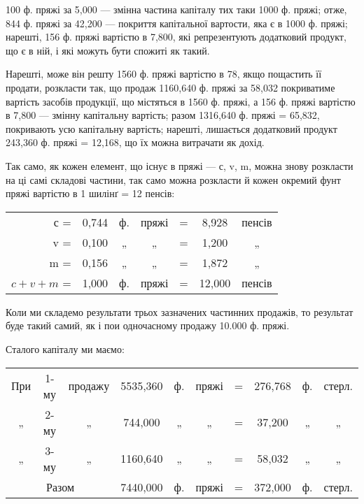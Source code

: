 \parcont{}  %
100 ф. пряжі за 5,000 — змінна частина капіталу тих таки
1000 ф. пряжі; отже, 844 ф. пряжі за 42,200 — покриття
капітальної вартости, яка є в 1000 ф. пряжі; нарешті, 156 ф. пряжі
вартістю в 7,800, які репрезентують додатковий продукт, що
є в ній, і які можуть бути спожиті як такий.

Нарешті, може він решту 1560 ф. пряжі вартістю в 78,
якщо пощастить її продати, розкласти так, що продаж 1160,640 ф.
пряжі за 58,032 покриватиме вартість засобів продукції, що
містяться в 1560 ф. пряжі, а 156 ф. пряжі вартістю в 7,800 —
змінну капітальну вартість; разом 1316,640 ф. пряжі = 65,832,
покривають усю капітальну вартість; нарешті, лишається додатковий
продукт 243,360 ф. пряжі = 12,168, що їх можна витрачати як
дохід.

Так само, як кожен елемент, що існує в пряжі — с, v, m, можна
знову розкласти на ці самі складові частини, так само можна розкласти й
кожен окремий фунт пряжі вартістю в 1 шилінґ = 12 пенсів:
\begin{table}[h]
\centering
\setlength{\tabcolsep}{2pt}
\begin{tabularx}{\textwidth}{r c c c c c c}

с = & 0,744 & ф. & пряжі & = & 8,928 & пенсів \\
v = & 0,100 & „ & „ & = & 1,200 & „ \\
m = & 0,156 & „ & „ & = & 1,872 & „ \\
\cmidrule{1-7}
$c + v + m$  = & 1,000 & ф. & пряжі & = & 12,000 & пенсів \\
\end{tabularx}
\end{table}
Коли ми складемо результати трьох зазначених частинних продажів, то
результат буде такий самий, як і пои одночасному продажу 10.000 ф.
пряжі.

Сталого капіталу ми маємо:

\begin{table}[h]
  \setlength{\tabcolsep}{2pt}
  \begin{tabularx}{\textwidth}{c c c c c c c c c c}
    При & 1-му & продажу & 5535,360 & ф. & пряжі & = & 276,768 & ф. & стерл.\\
    „ & 2-му & „ & 744,000 & „ & „ & = & 37,200 & „ & „\\
    „ & 3-му & „ & 1160,640 & „ & „ & = & 58,032 & „ & „\\
    \cmidrule{1-10}
    \multicolumn{3}{c}{Разом} & 7440,000 & ф. & пряжі & = & 372,000 & ф. & стерл.\\
\end{tabularx}
\end{table}

